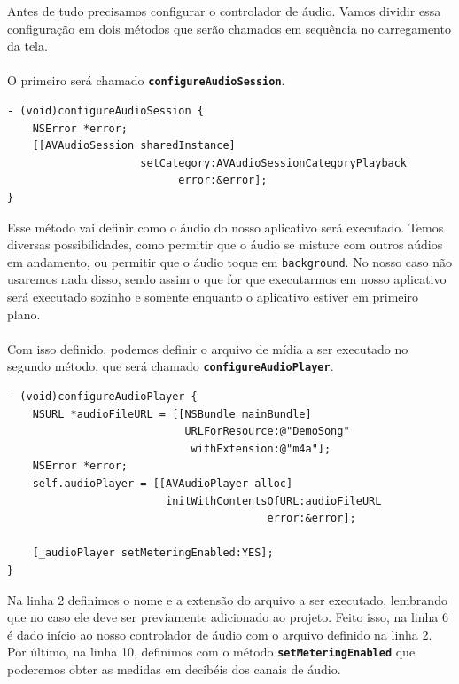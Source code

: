 \documentclass[a4paper,12pt,brazil,doubleside]{book}
\begin{document}
Antes de tudo precisamos configurar o controlador de áudio. Vamos dividir essa configuração em dois métodos que serão chamados em sequência no carregamento da tela.
\paragraph{}O primeiro será chamado \texttt{\textbf{configureAudioSession}}.

\begin{listing}
\begin{verbatim}
- (void)configureAudioSession {
    NSError *error;
    [[AVAudioSession sharedInstance]
                     setCategory:AVAudioSessionCategoryPlayback
                           error:&error];
}
\end{verbatim}
\end{listing}

Esse método vai definir como o áudio do nosso aplicativo será executado. Temos diversas possibilidades, como permitir que o áudio se misture com outros aúdios em andamento, ou permitir que o áudio toque em \texttt{background}. No nosso caso não usaremos nada disso, sendo assim o que for que executarmos em nosso aplicativo será executado sozinho e somente enquanto o aplicativo estiver em primeiro plano.
\paragraph{}Com isso definido, podemos definir o arquivo de mídia a ser executado no segundo método, que será chamado \texttt{\textbf{configureAudioPlayer}}.

\begin{listing}
\begin{verbatim}
- (void)configureAudioPlayer {
    NSURL *audioFileURL = [[NSBundle mainBundle]
                            URLForResource:@"DemoSong"
                             withExtension:@"m4a"];
    NSError *error;
    self.audioPlayer = [[AVAudioPlayer alloc]
                         initWithContentsOfURL:audioFileURL
                                         error:&error];
    
    [_audioPlayer setMeteringEnabled:YES];
}
\end{verbatim}
\end{listing}

Na linha 2 definimos o nome e a extensão do arquivo a ser executado, lembrando que no caso ele deve ser previamente adicionado ao projeto. Feito isso, na linha 6 é dado início ao nosso controlador de áudio com o arquivo definido na linha 2. Por último, na linha 10, definimos com o método \texttt{\textbf{setMeteringEnabled}} que poderemos obter as medidas em decibéis dos canais de áudio.
\end{document}
